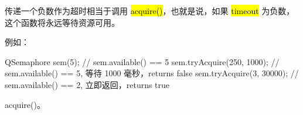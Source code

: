 \begin{notice}
传递一个负数作为超时相当于调用 \hl{acquire()}，也就是说，如果 \hl{timeout} 为负数，这个函数将永远等待资源可用。
\end{notice}

例如：

\begin{cppcode}
QSemaphore sem(5);            // sem.available() == 5
sem.tryAcquire(250, 1000);    // sem.available() == 5, 等待 1000 毫秒，returns false
sem.tryAcquire(3, 30000);     // sem.available() == 2, 立即返回，returns true
\end{cppcode}

\begin{seeAlso}
acquire()。
\end{seeAlso}

